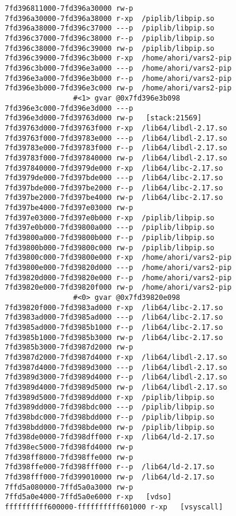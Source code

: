 {\begin{lstlisting}[style=example,caption={``Vars2 PiP'' output},label=out:vars2-pip]
7fd396811000-7fd396a30000 rw-p
7fd396a30000-7fd396a38000 r-xp	/piplib/libpip.so
7fd396a38000-7fd396c37000 ---p	/piplib/libpip.so
7fd396c37000-7fd396c38000 r--p	/piplib/libpip.so
7fd396c38000-7fd396c39000 rw-p	/piplib/libpip.so
7fd396c39000-7fd396c3b000 r-xp	/home/ahori/vars2-pip
7fd396c3b000-7fd396e3a000 ---p	/home/ahori/vars2-pip
7fd396e3a000-7fd396e3b000 r--p	/home/ahori/vars2-pip
7fd396e3b000-7fd396e3c000 rw-p	/home/ahori/vars2-pip
				#<1> gvar @0x7fd396e3b098
7fd396e3c000-7fd396e3d000 ---p
7fd396e3d000-7fd39763d000 rw-p	 [stack:21569]
7fd39763d000-7fd39763f000 r-xp	/lib64/libdl-2.17.so
7fd39763f000-7fd39783e000 ---p	/lib64/libdl-2.17.so
7fd39783e000-7fd39783f000 r--p	/lib64/libdl-2.17.so
7fd39783f000-7fd397840000 rw-p	/lib64/libdl-2.17.so
7fd397840000-7fd3979de000 r-xp	/lib64/libc-2.17.so
7fd3979de000-7fd397bde000 ---p	/lib64/libc-2.17.so
7fd397bde000-7fd397be2000 r--p	/lib64/libc-2.17.so
7fd397be2000-7fd397be4000 rw-p	/lib64/libc-2.17.so
7fd397be4000-7fd397e03000 rw-p
7fd397e03000-7fd397e0b000 r-xp	/piplib/libpip.so
7fd397e0b000-7fd39800a000 ---p	/piplib/libpip.so
7fd39800a000-7fd39800b000 r--p	/piplib/libpip.so
7fd39800b000-7fd39800c000 rw-p	/piplib/libpip.so
7fd39800c000-7fd39800e000 r-xp	/home/ahori/vars2-pip
7fd39800e000-7fd39820d000 ---p	/home/ahori/vars2-pip
7fd39820d000-7fd39820e000 r--p	/home/ahori/vars2-pip
7fd39820e000-7fd39820f000 rw-p	/home/ahori/vars2-pip
				#<0> gvar @0x7fd39820e098
7fd39820f000-7fd3983ad000 r-xp	/lib64/libc-2.17.so
7fd3983ad000-7fd3985ad000 ---p	/lib64/libc-2.17.so
7fd3985ad000-7fd3985b1000 r--p	/lib64/libc-2.17.so
7fd3985b1000-7fd3985b3000 rw-p	/lib64/libc-2.17.so
7fd3985b3000-7fd3987d2000 rw-p
7fd3987d2000-7fd3987d4000 r-xp	/lib64/libdl-2.17.so
7fd3987d4000-7fd3989d3000 ---p	/lib64/libdl-2.17.so
7fd3989d3000-7fd3989d4000 r--p	/lib64/libdl-2.17.so
7fd3989d4000-7fd3989d5000 rw-p	/lib64/libdl-2.17.so
7fd3989d5000-7fd3989dd000 r-xp	/piplib/libpip.so
7fd3989dd000-7fd398bdc000 ---p	/piplib/libpip.so
7fd398bdc000-7fd398bdd000 r--p	/piplib/libpip.so
7fd398bdd000-7fd398bde000 rw-p	/piplib/libpip.so
7fd398de0000-7fd398dff000 r-xp	/lib64/ld-2.17.so
7fd398ec5000-7fd398fd4000 rw-p
7fd398ff8000-7fd398ffe000 rw-p
7fd398ffe000-7fd398fff000 r--p	/lib64/ld-2.17.so
7fd398fff000-7fd399010000 rw-p	/lib64/ld-2.17.so
7ffd5a080000-7ffd5a0a3000 rw-p
7ffd5a0e4000-7ffd5a0e6000 r-xp	 [vdso]
ffffffffff600000-ffffffffff601000 r-xp	 [vsyscall]
\end{lstlisting}}
